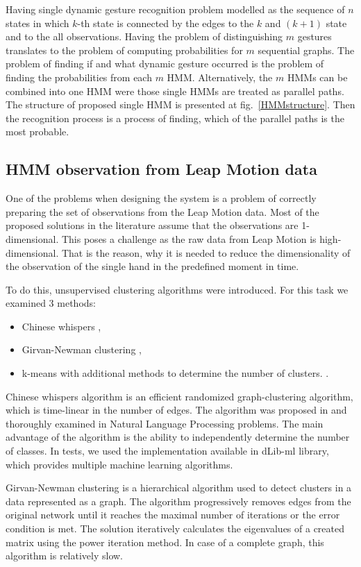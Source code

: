 Having single dynamic gesture recognition problem modelled as the sequence of $n$ states in which $k$-th state is connected by the edges to the $k$ and $(k+1)$ state and to the all observations.
Having the problem of distinguishing $m$ gestures translates to the problem of computing probabilities for $m$ sequential graphs.
The problem of finding if and what dynamic gesture occurred is the problem of finding the probabilities from each $m$ HMM.
Alternatively, the $m$ HMMs can be combined into one HMM were those single HMMs are treated as parallel paths.
The structure of proposed single HMM is presented at fig.~\ref{HMMstructure}.
Then the recognition process is a process of finding, which of the parallel paths is the most probable.

\subsection{HMM observation from Leap Motion data}

One of the problems when designing the system is a problem of correctly preparing the set of observations from the Leap Motion data.
Most of the proposed solutions in the literature assume that the observations are 1-dimensional.
This poses a challenge as the raw data from Leap Motion is high-dimensional.
That is the reason, why it is needed to reduce the dimensionality of the observation of the single hand in the predefined moment in time.

To do this, unsupervised clustering algorithms were introduced. 
For this task we examined 3 methods:
\begin{itemize}
\item Chinese whispers \cite{CW1, CW2},
\item Girvan-Newman clustering \cite{Newman},
\item k-means with additional methods to determine the number of clusters. \cite{kmeans1, kmeans2}.
\end{itemize}

Chinese whispers algorithm is an efficient randomized graph-clustering algorithm, which is time-linear in the number of edges.
The algorithm was proposed in \cite{CW1} and thoroughly examined in Natural Language Processing problems. 
The main advantage of the algorithm is the ability to independently determine the number of classes. 
In tests, we used the implementation available in dLib-ml library\cite{dlib}, which provides multiple machine learning algorithms.

Girvan-Newman clustering is a hierarchical algorithm used to detect clusters in a data represented as a graph.
The algorithm progressively removes edges from the original network until it reaches the maximal number of iterations or the error condition is met.
The solution iteratively calculates the eigenvalues of a created matrix using the power iteration method. 
In case of a complete graph, this algorithm is relatively slow.

